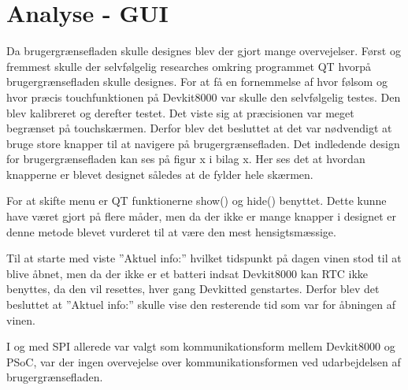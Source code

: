 \section{Analyse - GUI}

Da brugergrænsefladen skulle designes blev der gjort mange overvejelser. Først og fremmest skulle der selvfølgelig researches omkring programmet QT hvorpå brugergrænsefladen skulle designes. For at få en fornemmelse af hvor følsom og hvor præcis touchfunktionen på Devkit8000 var skulle den selvfølgelig testes. Den blev kalibreret og derefter testet. Det viste sig at præcisionen var meget begrænset på touchskærmen. Derfor blev det besluttet at det var nødvendigt at bruge store knapper til at navigere på brugergrænsefladen. Det indledende design for brugergrænsefladen kan ses på figur x i bilag x. Her ses det at hvordan knapperne er blevet designet således at de fylder hele skærmen.

For at skifte menu er QT funktionerne show() og hide() benyttet. Dette kunne have været gjort på flere måder, men da der ikke er mange knapper i designet er denne metode blevet vurderet til at være den mest hensigtsmæssige.

Til at starte med viste ”Aktuel info:” hvilket tidspunkt på dagen vinen stod til at blive åbnet, men da der ikke er et batteri indsat Devkit8000 kan RTC ikke benyttes, da den vil resettes, hver gang Devkitted genstartes. Derfor blev det besluttet at ”Aktuel info:” skulle vise den resterende tid som var for åbningen af vinen.
 
I og med SPI allerede var valgt som kommunikationsform mellem Devkit8000 og PSoC, var der ingen overvejelse over kommunikationsformen ved udarbejdelsen af brugergrænsefladen. 
